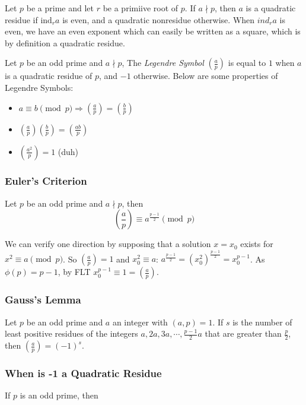 \documentclass{article}
\begin{document}
\begin{multicols*}{2}
Let $p$ be a prime and let $r$ be a primiive root of $p$. If $a \nmid p$, then $a$ is a quadratic residue if $\text{ind}_ra$ is even, and a quadratic nonresidue otherwise. When $\textit{ind}_ra$ is even, we have an even exponent which can easily be written as a square, which is by definition a quadratic residue.

Let $p$ be an odd prime and $a \nmid p$, The \textit{Legendre Symbol} $\left(\frac{a}{p}\right)$ is equal to $1$ when $a$ is a quadratic residue of $p$, and $-1$ otherwise. Below are some properties of Legendre Symbols:

\begin{itemize}
\item $a \equiv b \pmod{p} \Rightarrow \left(\frac{a}{p}\right)=\left(\frac{b}{p}\right)$
\item $\left(\frac{a}{p}\right)\left(\frac{b}{p}\right)=\left(\frac{ab}{p}\right)$
\item $\left(\frac{a^2}{p}\right) = 1$ (duh)
\end{itemize}

\subsubsection*{Euler's Criterion}

Let $p$ be an odd prime and $a \nmid p$, then \[\left(\frac{a}{p}\right) \equiv a^{\frac{p-1}{2}} \pmod{p}\]

We can verify one direction by supposing that a solution $x = x_0$ exists for $x^2 \equiv a \pmod{p}$. So $\left(\frac{a}{p}\right) = 1$ and $x_0^2 \equiv a$: $a^{\frac{p-1}{2}} = (x_0^2)^{\frac{p-1}{2}} = x_0^{p-1}$. As $\phi(p) = p-1$, by FLT $x_0^{p-1} \equiv 1 = \left(\frac{a}{p}\right)$.

\subsubsection*{Gauss's Lemma}

Let $p$ be an odd prime and $a$ an integer with $(a,p) = 1$. If $s$ is the number of least positive residues of the integers $a, 2a, 3a, \cdots, \frac{p-1}{2}a$ that are greater than $\frac{p}{2}$, then $\left(\frac{a}{p}\right) = (-1)^s$.

\subsubsection*{When is -1 a Quadratic Residue}

If $p$ is an odd prime, then


\end{multicols*}
\end{document}
